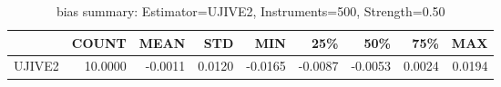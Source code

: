 \begin{table}[ht]
\centering
\caption{bias summary: Estimator=UJIVE2, Instruments=500, Strength=0.50}
\begin{tabular}{lrrrrrrrr}
\toprule
 & COUNT & MEAN & STD & MIN & 25\% & 50\% & 75\% & MAX \\
\midrule
UJIVE2 & 10.0000 & -0.0011 & 0.0120 & -0.0165 & -0.0087 & -0.0053 & 0.0024 & 0.0194 \\
\bottomrule
\end{tabular}
\end{table}

